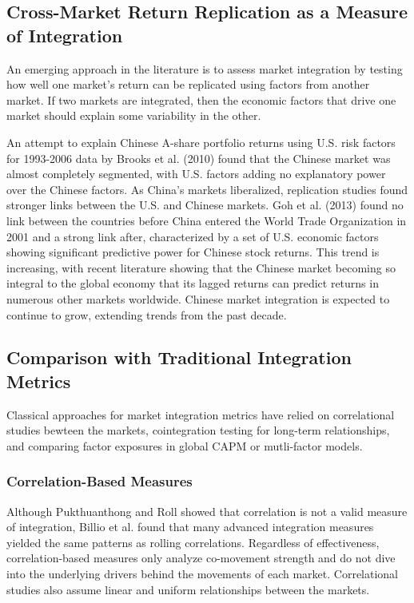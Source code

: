 \subsection{Cross-Market Return Replication as a Measure of Integration}

An emerging approach in the literature is to assess market integration by testing how well one market's return can be replicated using factors from another market. If two markets are integrated, then the economic factors that drive one market should explain some variability in the other. 

An attempt to explain Chinese A-share portfolio returns using U.S. risk factors for 1993-2006 data by Brooks et al. (2010) found that the Chinese market was almost completely segmented, with U.S. factors adding no explanatory power over the Chinese factors.\cite{brooks} As China's markets liberalized, replication studies found stronger links between the U.S. and Chinese markets. Goh et al. (2013) found no link between the countries before China entered the World Trade Organization in 2001 and a strong link after, characterized by a set of U.S. economic factors showing significant predictive power for Chinese stock returns.\cite{goh} This trend is increasing, with recent literature showing that the Chinese market becoming so integral to the global economy that its lagged returns can predict returns in numerous other markets worldwide. Chinese market integration is expected to continue to grow, extending trends from the past decade.

\subsection{Comparison with Traditional Integration Metrics}

Classical approaches for market integration metrics have relied on correlational studies bewteen the markets, cointegration testing for long-term relationships, and comparing factor exposures in global CAPM or mutli-factor models.

\subsubsection{Correlation-Based Measures}

Although Pukthuanthong and Roll showed that correlation is not a valid measure of integration, Billio et al. found that many advanced integration measures yielded the same patterns as rolling correlations.\cite{billio} Regardless of effectiveness, correlation-based measures only analyze co-movement strength and do not dive into the underlying drivers behind the movements of each market. Correlational studies also assume linear and uniform relationships between the markets. 

